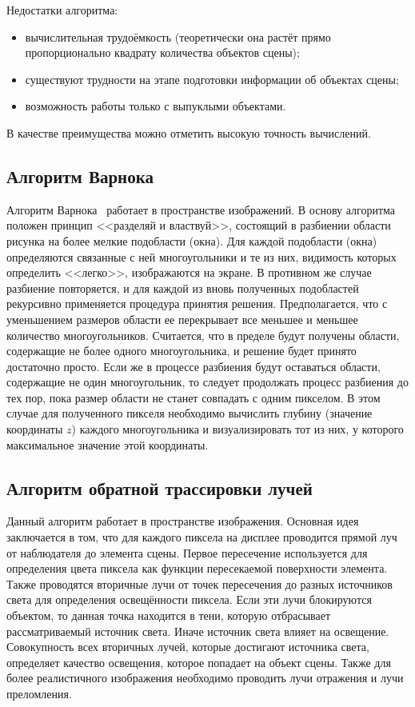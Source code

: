 Недостатки алгоритма:
\begin{itemize}[label=---]
    \item вычислительная трудоёмкость (теоретически она растёт прямо пропорционально квадрату количества объектов сцены);
    \item существуют трудности на этапе подготовки информации об объектах сцены;
    \item возможность работы только с выпуклыми объектами.
\end{itemize}

В качестве преимущества можно отметить высокую точность вычислений.

\subsection{Алгоритм Варнока}

Алгоритм Варнока~\cite{math_cg} работает в пространстве изображений. В основу алгоритма положен принцип <<разделяй и властвуй>>, состоящий в разбиении области рисунка на более мелкие подобласти (окна). Для каждой подобласти (окна) определяются связанные с ней многоугольники и те из них, видимость которых определить <<легко>>, изображаются на экране. В противном же случае разбиение повторяется, и для каждой из вновь полученных подобластей рекурсивно применяется процедура принятия решения. Предполагается, что с уменьшением размеров области ее перекрывает все меньшее и меньшее количество многоугольников. Считается, что в пределе будут получены области, содержащие не более одного многоугольника, и решение будет принято достаточно просто. Если же в процессе разбиения будут оставаться области, содержащие не один многоугольник, то следует продолжать процесс разбиения до тех пор, пока размер области не станет совпадать с одним пикселом. В этом случае для полученного пикселя необходимо вычислить глубину (значение координаты $z$) каждого многоугольника и визуализировать тот из них, у которого максимальное значение этой координаты.

\subsection{Алгоритм обратной трассировки лучей}

Данный алгоритм работает в пространстве изображения. Основная идея заключается в том, что для каждого пиксела на дисплее проводится прямой луч от наблюдателя до элемента сцены. Первое пересечение используется для определения цвета пиксела как функции пересекаемой поверхности элемента. Также проводятся вторичные лучи от точек пересечения до разных источников света для определения освещённости пиксела. Если эти лучи блокируются объектом, то данная точка находится в тени, которую отбрасывает рассматриваемый источник света. Иначе источник света влияет на освещение. Совокупность всех вторичных лучей, которые достигают источника света, определяет качество освещения, которое попадает на объект сцены. Также для более реалистичного изображения необходимо проводить лучи отражения и лучи преломления.

